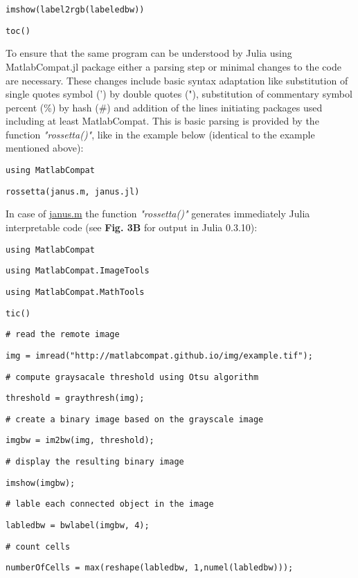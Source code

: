 \verb|imshow(label2rgb(labeledbw))|

\verb|toc()|



To ensure that the same program can be understood by Julia using MatlabCompat.jl package either a parsing step or minimal changes to the code are necessary. These changes include basic syntax adaptation like substitution of single quotes symbol (') by double quotes ("), substitution of commentary symbol percent (\%) by hash (\#) and addition of the lines initiating packages used including at least MatlabCompat. This is basic parsing is provided by the function \textit{"rossetta()"}, like in the example below (identical to the example mentioned above):



\verb|using MatlabCompat|

\verb|rossetta(janus.m, janus.jl)|



In case of \href{https://github.com/MatlabCompat/MatlabCompat.jl/blob/dev/test/janus.m}{janus.m} the function \textit{"rossetta()"} generates immediately Julia interpretable code (see \textbf{Fig. 3B} for output in Julia 0.3.10):



\verb|using MatlabCompat|

\verb|using MatlabCompat.ImageTools|

\verb|using MatlabCompat.MathTools|

\verb|tic()|

\verb|# read the remote image|

\verb|img = imread("http://matlabcompat.github.io/img/example.tif");|

\verb|# compute graysacale threshold using Otsu algorithm|

\verb|threshold = graythresh(img);|

\verb|# create a binary image based on the grayscale image|

\verb|imgbw = im2bw(img, threshold);|

\verb|# display the resulting binary image|

\verb|imshow(imgbw);|

\verb|# lable each connected object in the image|

\verb|labledbw = bwlabel(imgbw, 4);|

\verb|# count cells|

\verb|numberOfCells = max(reshape(labledbw, 1,numel(labledbw)));|

